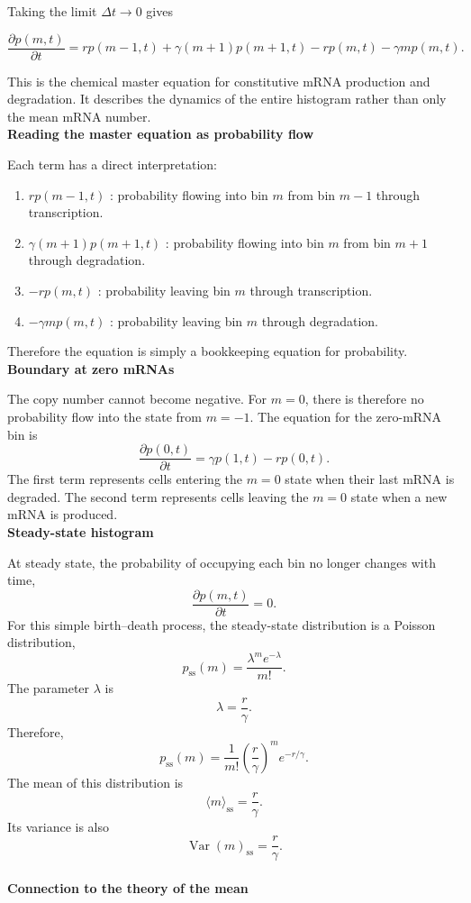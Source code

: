Taking the limit $\Delta t\rightarrow0$ gives

\[
    \boxed{
    \frac{\partial p(m,t)}{\partial t}
    = rp(m-1,t)
    + \gamma(m+1)p(m+1,t)
    - rp(m,t)
    - \gamma m p(m,t)
    }.
\]

This is the chemical master equation for constitutive mRNA production and degradation.
It describes the dynamics of the entire histogram rather than only the mean mRNA number.
% 
% 
\medskip
\\
\textbf{Reading the master equation as probability flow}

Each term has a direct interpretation:
\begin{enumerate}
    \item $rp(m-1,t)$ : probability flowing into bin $m$ from bin $m-1$ through transcription.
    \item $\gamma(m+1)p(m+1,t)$ : probability flowing into bin $m$ from bin $m+1$ through degradation.
    \item $-rp(m,t)$ : probability leaving bin $m$ through transcription.
    \item $-\gamma m p(m,t)$ : probability leaving bin $m$ through degradation.
\end{enumerate}
Therefore the equation is simply a bookkeeping equation for probability.
% 
% 
\medskip
\\
\textbf{Boundary at zero mRNAs}

The copy number cannot become negative.
For $m=0$, there is therefore no probability flow into the state from $m=-1$.
The equation for the zero-mRNA bin is
\[
    \frac{\partial p(0,t)}{\partial t}
    = \gamma p(1,t) - rp(0,t).
\]
The first term represents cells entering the $m=0$ state when their last mRNA is degraded.
The second term represents cells leaving the $m=0$ state when a new mRNA is produced.
% 
% 
\medskip
\\
\textbf{Steady-state histogram}

At steady state, the probability of occupying each bin no longer changes with time,
\[
    \frac{\partial p(m,t)}{\partial t}=0.
\]
For this simple birth--death process, the steady-state distribution is a Poisson distribution,
\[
    \boxed{
    p_{\mathrm{ss}}(m)
    = \frac{\lambda^m e^{-\lambda}}{m!}
    }.
\]
The parameter $\lambda$ is
\[
    \lambda=\frac{r}{\gamma}.
\]
Therefore,
\[
    \boxed{
    p_{\mathrm{ss}}(m)
    = \frac{1}{m!}
    \left(\frac{r}{\gamma}\right)^m
    e^{-r/\gamma}
    }.
\]
The mean of this distribution is
\[
    \langle m\rangle_{\mathrm{ss}}=\frac{r}{\gamma}.
\]
Its variance is also
\[
    \operatorname{Var}(m)_{\mathrm{ss}}=\frac{r}{\gamma}.
\]
% 
% 
\medskip
\\
\textbf{Connection to the theory of the mean}

